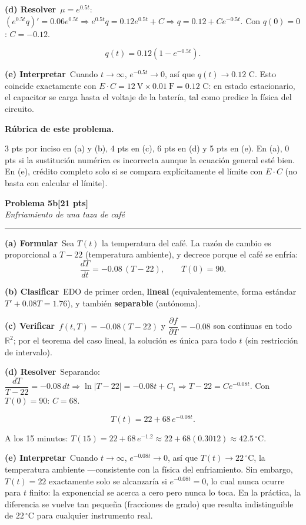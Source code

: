 \documentclass[11pt,letterpaper]{article}
\newcommand{\problema}[3]{%
  \bigskip\noindent
  {\large\textbf{Problema #1}}\hfill\textbf{[#2 pts]}\\[3pt]
  {\small\itshape #3}\par
  \vspace{2pt}\hrule\vspace{8pt}
}
\newcommand{\subparte}[2]{%
  \medskip\noindent\textbf{(#1}\ #2\par\smallskip
}
\newenvironment{resultado}
  {\begin{mdframed}[linecolor=black,linewidth=0.6pt,
    innerleftmargin=6pt,innerrightmargin=6pt,innertopmargin=4pt,innerbottommargin=4pt]
   \bfseries}
  {\end{mdframed}}
\newenvironment{rubrica}{%
  \begin{mdframed}[linecolor=black,linewidth=0.6pt,
    innerleftmargin=8pt,innerrightmargin=8pt,innertopmargin=5pt,innerbottommargin=5pt]
  \small\textbf{Rúbrica de este problema.}\par\smallskip
}{\end{mdframed}}
\begin{document}
\subparte{d) Resolver}{$\mu=e^{0.5t}$: $(e^{0.5t}q)'=0.06e^{0.5t} \Rightarrow e^{0.5t}q = 0.12e^{0.5t}+C \Rightarrow q=0.12+Ce^{-0.5t}$. Con $q(0)=0$: $C=-0.12$.
\begin{resultado}
\[
q(t) = 0.12\left(1-e^{-0.5t}\right).
\]
\end{resultado}}

\subparte{e) Interpretar}{Cuando $t\to\infty$, $e^{-0.5t}\to0$, así que $q(t)\to 0.12$ C. Esto coincide exactamente con $E\cdot C = 12\ \text{V}\times0.01\ \text{F}=0.12$ C: en estado estacionario, el capacitor se carga hasta el voltaje de la batería, tal como predice la física del circuito.}

\begin{rubrica}
3 pts por inciso en (a) y (b), 4 pts en (c), 6 pts en (d) y 5 pts en (e). En (a), 0 pts si la sustitución numérica es incorrecta aunque la ecuación general esté bien. En (e), crédito completo solo si se compara explícitamente el límite con $E\cdot C$ (no basta con calcular el límite).
\end{rubrica}

\problema{5b}{21}{Enfriamiento de una taza de café}

\subparte{a) Formular}{Sea $T(t)$ la temperatura del café. La razón de cambio es proporcional a $T-22$ (temperatura ambiente), y decrece porque el café se enfría:
\[
\frac{dT}{dt} = -0.08\,(T-22), \qquad T(0)=90.
\]}

\subparte{b) Clasificar}{EDO de primer orden, \textbf{lineal} (equivalentemente, forma estándar $T'+0.08T=1.76$), y también \textbf{separable} (autónoma).}

\subparte{c) Verificar}{$f(t,T)=-0.08(T-22)$ y $\dfrac{\partial f}{\partial T}=-0.08$ son continuas en todo $\mathbb{R}^2$; por el teorema del caso lineal, la solución es única para todo $t$ (sin restricción de intervalo).}

\subparte{d) Resolver}{Separando: $\dfrac{dT}{T-22}=-0.08\,dt \Rightarrow \ln|T-22|=-0.08t+C_1 \Rightarrow T-22=Ce^{-0.08t}$. Con $T(0)=90$: $C=68$.
\begin{resultado}
\[
T(t) = 22+68\,e^{-0.08t}.
\]
\end{resultado}
A los 15 minutos: $T(15)=22+68\,e^{-1.2}\approx 22+68(0.3012)\approx 42.5\,^\circ\text{C}$.}

\subparte{e) Interpretar}{Cuando $t\to\infty$, $e^{-0.08t}\to0$, así que $T(t)\to22\,^\circ\text{C}$, la temperatura ambiente —consistente con la física del enfriamiento. Sin embargo, $T(t)=22$ exactamente solo se alcanzaría si $e^{-0.08t}=0$, lo cual nunca ocurre para $t$ finito: la exponencial se acerca a cero pero nunca lo toca. En la práctica, la diferencia se vuelve tan pequeña (fracciones de grado) que resulta indistinguible de $22\,^\circ\text{C}$ para cualquier instrumento real.}
\end{document}
